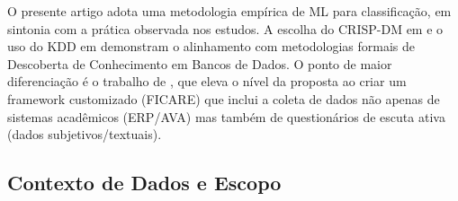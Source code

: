 \documentclass[english, spanish, brazilian]{RBIEarticle} %
\begin{document}
O presente artigo adota uma metodologia empírica de ML para classificação, em sintonia com a prática observada nos estudos. A escolha do CRISP-DM em \cite{jesus2024mapeamento} e o uso do KDD em \cite{ramos2018comparativo} demonstram o alinhamento com metodologias formais de Descoberta de Conhecimento em Bancos de Dados. O ponto de maior diferenciação é o trabalho de \cite{neves2024ficare}, que eleva o nível da proposta ao criar um framework customizado (FICARE) que inclui a coleta de dados não apenas de sistemas acadêmicos (ERP/AVA) mas também de questionários de escuta ativa (dados subjetivos/textuais).


\newpage
\subsection{Contexto de Dados e Escopo}
\end{document}
